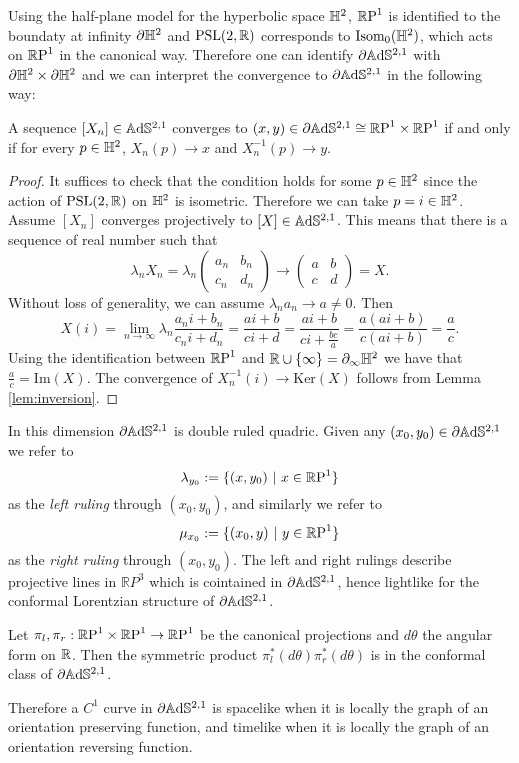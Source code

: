 Using the half-plane model for the hyperbolic space $\H^2$, $\S$ is identified to the boundaty at infinity $\partial \H^2$ and $\PSL$ corresponds to $\text{Isom}_0(\H^2)$, which acts on $\S$ in the canonical way.
Therefore one can identify $\partial \A^{2,1}$ with $\partial \H^2 \times \partial \H^2$ and we can interpret the convergence to $\partial \A^{2,1}$ in the following way:
\begin{lemma} \label{lem:convergence}
    A sequence $[X_n] \in \A^{2,1}$ converges to $(x,y) \in \partial \A^{2,1} \cong \T$ if and only if for every $p\in\H^2$, $X_n(p) \to x$ and $X_n^{-1}(p) \to y$.
\end{lemma}

\begin{proof}
    It suffices to check that the condition holds for some $p\in\H^2$ since the action of $\PSL$ on $\H^2$ is isometric. Therefore we can take $p=i\in\H^2$. Assume $\left[ X_n \right]$ converges projectively to $\left[ X \right] \in \A^{2,1}$. This means that there is a sequence of real number such that
    \[
       \lambda_n X_n = \lambda_n
       \begin{pmatrix}
            a_n & b_n \\ c_n & d_n
        \end{pmatrix} \to
        \begin{pmatrix}
            a & b \\ c & d
        \end{pmatrix} =X.
    \]
    Without loss of generality, we can assume $\lambda_n a_n \to a \neq 0$. Then 
    \[
        X(i) = \lim_{n\to \infty} \lambda_n \frac{a_n i + b_n}{c_n i + d_n} = \frac{ai +b}{ci+d} = \frac{ai + b}{ ci + \frac{bc}{a}} = \frac{a(ai+b)}{c(ai+b)} = \frac{a}{c}.
    \]
    Using the identification between $\S$ and $\R \cup \{ \infty \} = \partial_\infty \H^2$ we have that $\frac{a}{c} = \text{Im}(X)$. The convergence of $X_n^{-1}(i) \to \text{Ker}(X)$ follows from Lemma \ref{lem:inversion}.
\end{proof}

In this dimension $\partial\A^{2,1}$ is double ruled quadric. Given any $(x_0,y_0) \in \partial\A^{2,1}$ we refer to
\[
    \lambda_{y_0} := \{ (x,y_0) \ | \ x \in\S \}
\]
as the \textit{left ruling} through $(x_0,y_0)$, and similarly we refer to
\[
    \mu_{x_0} := \{ (x_0,y) \ | \ y \in\S \}
\]
as the \textit{right ruling} through $(x_0,y_0)$. The left and right rulings describe projective lines in $\mathbb{R}P^3$ which is cointained in $\partial\A^{2,1}$, hence lightlike for the conformal Lorentzian structure of $\partial\A^{2,1}$.
\begin{proposition} \label{prop:angular}
    Let $\pi_l, \pi_r : \T \to\S$ be the canonical projections and $d\theta$ the angular form on $\R$. Then the symmetric product $\pi_l^*(d\theta)\pi_r^*(d\theta)$ is in the conformal class of $\partial\A^{2,1}$.
\end{proposition}
Therefore a $C^1$ curve in $\partial\A^{2,1}$ is spacelike when it is locally the graph of an orientation preserving function, and timelike when it is locally the graph of an orientation reversing function.

